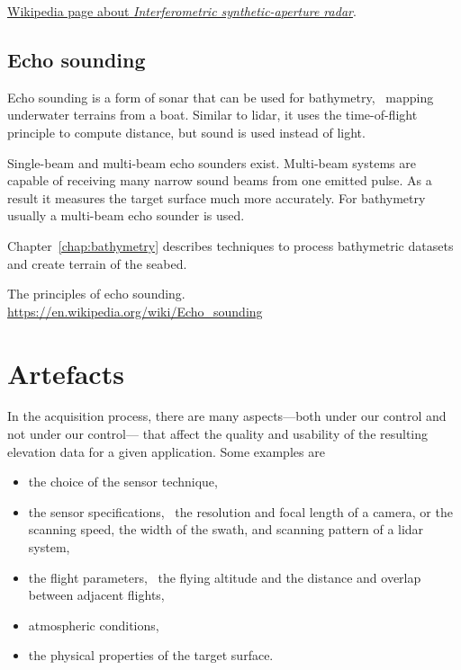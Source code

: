 
\begin{floatbox}
	\begin{kaobox-toread}[frametitle=\faExternalLink\ To read or to watch]
		\href{https://en.wikipedia.org/wiki/Interferometric_synthetic-aperture_radar}{Wikipedia page about \emph{Interferometric synthetic-aperture radar}}.
	\end{kaobox-toread}
\end{floatbox}


\subsection{Echo sounding}%
\label{sec:mbes}
Echo sounding is a form of sonar that can be used for bathymetry, \ie\ mapping underwater terrains from a boat. 
Similar to lidar, it uses the time-of-flight principle to compute distance, but sound is used instead of light. 

Single-beam and multi-beam echo sounders exist. Multi-beam systems are capable of receiving many narrow sound beams from one emitted pulse. As a result it measures the target surface much more accurately. 
For bathymetry usually a multi-beam echo sounder is used.

Chapter~\ref{chap:bathymetry} describes techniques to process bathymetric datasets and create terrain of the seabed.

\begin{floatbox}
	\begin{kaobox-toread}[frametitle=\faExternalLink\ To read or to watch]
	  The principles of echo sounding.
	  \\
	  \url{https://en.wikipedia.org/wiki/Echo_sounding}
	\end{kaobox-toread}
\end{floatbox}



\section{Artefacts}%
\label{sec:artefacts}

In the acquisition process, there are many aspects---both under our control and not under our control--- that affect the quality and usability of the resulting elevation data for a given application. 
Some examples are
\begin{itemize}
	\item the choice of the sensor technique, 
	\item the sensor specifications, \eg\ the resolution and focal length of a camera, or the scanning speed, the width of the swath, and scanning pattern of a lidar system,
	\item the flight parameters, \eg\ the flying altitude and the distance and overlap between adjacent flights,
	\item atmospheric conditions, 
	\item the physical properties of the target surface.
\end{itemize}

